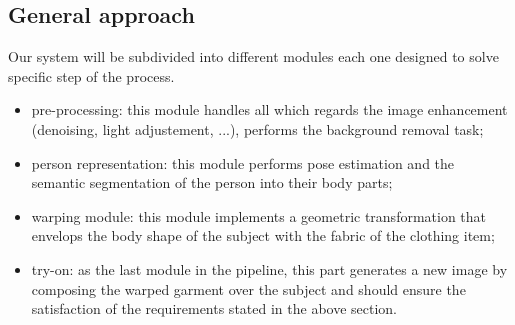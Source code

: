 \begin{multicols}{2}
\subsection{General approach}
Our system will be subdivided into different modules each one designed to solve specific step of the process.
\begin{itemize}
\item pre-processing: this module handles all which regards the image enhancement (denoising, light adjustement, ...), performs the background removal task;
\item person representation: this module performs pose estimation and the semantic segmentation of the person into their body parts;
\item warping module: this module implements a geometric transformation that envelops the body shape of the subject with the fabric of the clothing item;
\item try-on: as the last module in the pipeline, this part generates a new image by composing the warped garment over the subject and should ensure the satisfaction of the requirements stated in the above section.

\end{itemize}


\end{multicols}